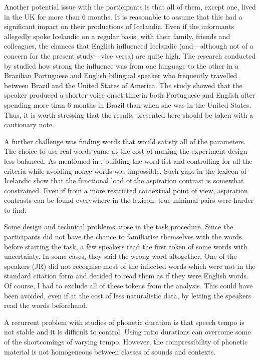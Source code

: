 \documentclass[11pt,a4paper,openany]{memoir}\usepackage[]{graphicx}\usepackage[]{color}
\begin{document}
Another potential issue with the participants is that all of them, except one, lived in the UK for more than 6 months.
It is reasonable to assume that this had a significant impact on their productions of Icelandic.
Even if the informants allegedly spoke Icelandic on a regular basis, with their family, friends and colleagues, the chances that English influenced Icelandic (and---although not of a concern for the present study---vice versa) are quite high.
The research conducted by \citet{sancier1997} studied how strong the influence was from one language to the other in a Brazilian Portuguese and English bilingual speaker who frequently travelled between Brazil and the United States of America.
The study showed that the speaker produced a shorter voice onset time in both Portuguese and English after spending more than 6 months in Brazil than when she was in the United States.
Thus, it is worth stressing that the results presented here should be taken with a cautionary note.

A further challenge was finding words that would satisfy all of the parameters.
The choice to use real words came at the cost of making the experiment design less balanced.
As mentioned in , building the word list and controlling for all the criteria while avoiding nonce-words was impossible.
Such gaps in the lexicon of Icelandic show that the functional load of the aspiration contrast is somewhat constrained.
Even if from a more restricted contextual point of view, aspiration contrasts can be found everywhere in the lexicon, true minimal pairs were harder to find.

Some design and technical problems arose in the task procedure.
Since the participants did not have the chance to familiarise themselves with the words before starting the task, a few speakers read the first token of some words with uncertainty.
In some cases, they said the wrong word altogether.
One of the speakers (JR) did not recognise most of the inflected words which were not in the standard citation form and decided to read them as if they were English words.
Of course, I had to exclude all of these tokens from the analysis.
This could have been avoided, even if at the cost of less naturalistic data, by letting the speakers read the words beforehand.

A recurrent problem with studies of phonetic duration is that speech tempo is not stable and it is difficult to control.
Using ratio durations can overcome some of the shortcomings of varying tempo.
However, the compressibility of phonetic material is not homogeneous between classes of sounds and contexts.
\end{document}
